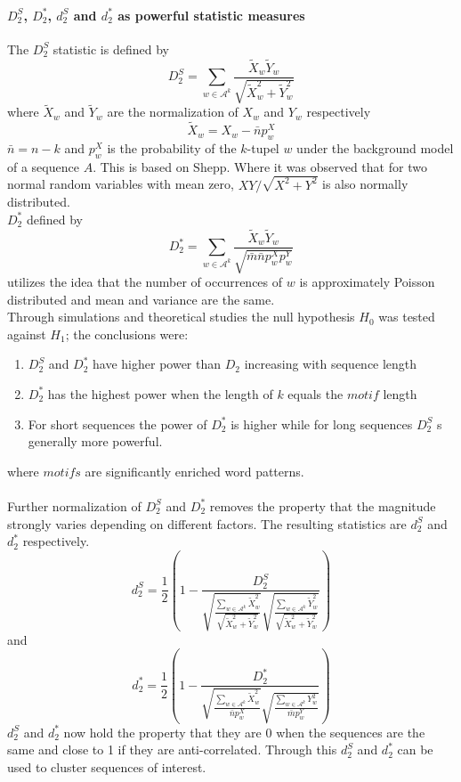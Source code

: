 \documentclass[twocolumn]{bmcart}%
\begin{document}
\paragraph*{$D_2^S$, $D_2^*$, $d_2^S$ and $d_2^*$ as powerful statistic measures}
The $D_2^S$ statistic is defined by
$$D_2^S=\sum_{w\in \mathcal{A}^k}\frac{\widetilde{X}_w\widetilde{Y}_w}{\sqrt{\widetilde{X}_w^2+\widetilde{Y}_w^2}}$$
where $\widetilde{X}_w$ and $\widetilde{Y}_w$ are the normalization of $X_w$ and $Y_w$ respectively
$$\widetilde{X}_w=X_w-\bar{n}p_w^X$$
$\bar{n}=n-k$ and $p_w^X$ is the probability of the  $k$-tupel $w$ under the background model of a sequence $A$.
This is based on Shepp\cite{shepp1962normal}. Where it was observed that for two normal random variables with mean zero, $XY/\sqrt{X^2+Y^2}$ is also normally distributed.\\
$D_2^*$ defined by
$$D_2^*=\sum_{w\in \mathcal{A}^k}\frac{\widetilde{X}_w\widetilde{Y}_w}{\sqrt{\bar{m}\bar{n}p_w^Xp_w^Y}}$$
utilizes the idea that the number of occurrences of $w$ is approximately Poisson distributed and mean and variance are the same.\\
Through simulations and theoretical studies the null hypothesis $H_0$ was tested against $H_1$; the conclusions were:
\begin{enumerate}
\item 	$D_2^S$ and $D_2^*$ have higher power than $D_2$ increasing with sequence length
\item $D_2^*$ has the highest power when the length of $k$ equals the $motif$ length
\item For short sequences the power of $D_2^*$ is higher while for long sequences $D_2^S$ s generally more powerful.
\end{enumerate}
where $motifs$ are significantly enriched word patterns\cite{doi:10.1093/bib/bbt067}.\\
\\
Further normalization of $D_2^S$ and $D_2^*$ removes the property that the magnitude strongly varies depending on different factors. The resulting statistics are $d_2^S$ and $d_2^*$ respectively.
$$d_2^S=\frac{1}{2}\left(1-\frac{D_2^S}{\sqrt{\frac{\sum_{w\in \mathcal{A}^k}\widetilde{X}_w^2}{\sqrt{\widetilde{X}_w^2+\widetilde{Y}_w^2}}}\sqrt{\frac{\sum_{w\in \mathcal{A}^k}\widetilde{Y}_w^2}{\sqrt{\widetilde{X}_w^2+\widetilde{Y}_w^2}}}}\right)$$
and
$$d_2^*=\frac{1}{2}\left(1-\frac{D_2^*}{\sqrt{\frac{\sum_{w\in \mathcal{A}^k}\widetilde{X}_w^2}{\bar{n}p_w^X}}\sqrt{\frac{\sum_{w\in \mathcal{A}^k}Y_w^2}{\bar{m}p_w^Y}}}\right)$$
$d_2^S$ and $d_2^*$ now hold the property that they are 0 when the sequences are the same and close to 1 if they are anti-correlated.
Through this $d_2^S$ and $d_2^*$ can be used to cluster sequences of interest. 
\end{document}
